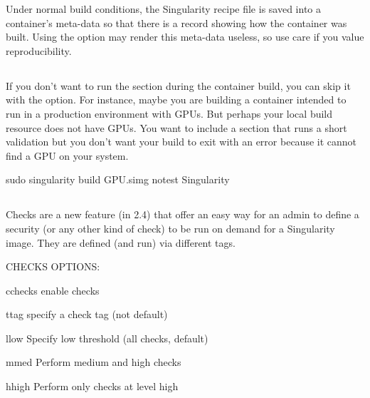 \documentclass[letterpaper,10pt,english]{sphinxmanual}
\begin{document}
Under normal build conditions, the Singularity recipe file is saved into
a container’s meta-data so that there is a record showing how the
container was built. Using the  option may render this meta-data useless, so use care if you value reproducibility.


\subsection{}
\label{\detokenize{build_a_container:notest}}
If you don’t want to run the  section during the container build, you can
skip it with the  option. For instance, maybe you are building a
container intended to run in a production environment with GPUs. But
perhaps your local build resource does not have GPUs. You want to
include a  section that runs a short validation but you don’t want your
build to exit with an error because it cannot find a GPU on your system.

%
\begin{sphinxVerbatim}[commandchars=\\\{\}]
\PYGZdl{} sudo singularity build GPU.simg \PYGZhy{}\PYGZhy{}notest Singularity
\end{sphinxVerbatim}


\subsection{}
\label{\detokenize{build_a_container:checks}}
Checks are a new feature (in 2.4) that offer an easy way for an admin
to define a security (or any other kind of check) to be run on demand
for a Singularity image. They are defined (and run) via different
tags.

%
\begin{sphinxVerbatim}[commandchars=\\\{\}]
CHECKS OPTIONS:

    \PYGZhy{}c\textbar{}\PYGZhy{}\PYGZhy{}checks    enable checks

    \PYGZhy{}t\textbar{}\PYGZhy{}\PYGZhy{}tag       specify a check tag (not default)

    \PYGZhy{}l\textbar{}\PYGZhy{}\PYGZhy{}low       Specify low threshold (all checks, default)

    \PYGZhy{}m\textbar{}\PYGZhy{}\PYGZhy{}med       Perform medium and high checks

    \PYGZhy{}h\textbar{}\PYGZhy{}\PYGZhy{}high      Perform only checks at level high
\end{sphinxVerbatim}
\end{document}
